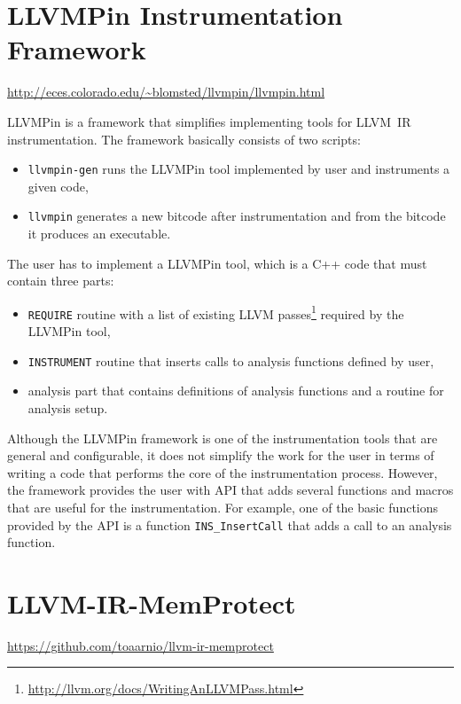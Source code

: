 \section{LLVMPin Instrumentation Framework}

\url{http://eces.colorado.edu/~blomsted/llvmpin/llvmpin.html}
\medskip

LLVMPin is a framework that simplifies implementing tools for LLVM~IR
instrumentation. The framework basically consists of two scripts:

\begin{itemize}
    \item \texttt{llvmpin-gen} runs the LLVMPin tool implemented by
          user and instruments a given code, 
    \item \texttt{llvmpin} generates a new
	  bitcode after instrumentation and from the bitcode it produces an
          executable.
\end{itemize}

The user has to implement a LLVMPin tool, which is a C++ code that must contain three
parts:

\begin{itemize}
    \item \texttt{REQUIRE} routine with a list of existing LLVM
          passes\footnote{\url{http://llvm.org/docs/WritingAnLLVMPass.html}} required by
          the LLVMPin tool,
    \item \texttt{INSTRUMENT} routine that inserts calls to analysis functions
          defined by user,
    \item analysis part that contains definitions of analysis functions and a
          routine for analysis setup.
\end{itemize}

Although the LLVMPin framework is one of the instrumentation tools that are
general and configurable, it does not simplify the work for the user in terms
of writing a code that performs the core of the instrumentation process.
However, the framework provides the user with API that adds several functions
and macros that are useful for the instrumentation. For example, one of the
basic functions provided by the API is a function \texttt{INS\_InsertCall} that
adds a call to an analysis function.

\section{LLVM-IR-MemProtect}

\url{https://github.com/toaarnio/llvm-ir-memprotect}

